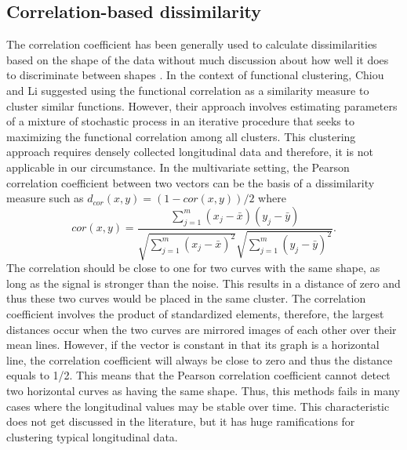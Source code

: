 \subsection{Correlation-based dissimilarity}
The correlation coefficient has been generally used to calculate dissimilarities based on the shape of the data without much discussion about how well it does to discriminate between shapes \cite{chouakria2007,  eisen1998, chiou2008}. In the context of functional clustering, Chiou and Li \cite{chiou2008} suggested using the functional correlation as a similarity measure to cluster similar functions. However, their approach involves estimating parameters of a mixture of stochastic process in an iterative procedure that seeks to maximizing the functional correlation among all clusters. This clustering approach requires densely collected longitudinal data and therefore, it is not applicable in our circumstance. In the multivariate setting, the Pearson correlation coefficient between two vectors can be the basis of a dissimilarity measure such as $d_{cor}(x,y) = (1-cor(x,y))/2$ where $$cor(x,y) = \frac{\sum^{m}_{j=1}(x_{j}-\bar{x})(y_{j}-\bar{y})}{\sqrt{\sum^{m}_{j=1}(x_{j}-\bar{x})^{2}}\sqrt{\sum^{m}_{j=1}(y_{j}-\bar{y})^{2}}}.$$
The correlation should be close to one for two curves with the same shape, as long as the signal is stronger than the noise. This results in a distance of zero and thus these two curves would be placed in the same cluster. The correlation coefficient involves the product of standardized elements, therefore, the largest distances occur when the two curves are mirrored images of each other over their mean lines. However, if the vector is constant in that its graph is a horizontal line, the correlation coefficient will always be close to zero and thus the distance equals to 1/2. This means that the Pearson correlation coefficient cannot detect two horizontal curves as having the same shape. Thus, this methods fails in many cases where the longitudinal values may be stable over time. This characteristic does not get discussed in the literature, but it has huge ramifications for clustering typical longitudinal data.

